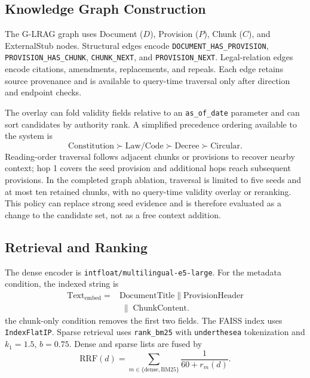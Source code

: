\subsection{Knowledge Graph Construction}
\label{sec:graph-construction}

The G-LRAG graph uses Document ($D$), Provision ($P$), Chunk ($C$), and
ExternalStub nodes. Structural edges encode
\texttt{DOCUMENT\_HAS\_PROVISION}, \texttt{PROVISION\_HAS\_CHUNK},
\texttt{CHUNK\_NEXT}, and \texttt{PROVISION\_NEXT}. Legal-relation edges encode
citations, amendments, replacements, and repeals. Each edge retains source
provenance and is available to query-time traversal only after direction and
endpoint checks.

The overlay can fold validity fields relative to an \texttt{as\_of\_date}
parameter and can sort candidates by authority rank. A simplified precedence
ordering available to the system is
\begin{equation}
\text{Constitution} \succ \text{Law/Code} \succ
\text{Decree} \succ \text{Circular}.
\end{equation}
Reading-order traversal follows adjacent chunks or provisions to recover
nearby context; hop 1 covers the seed provision and additional hops reach
subsequent provisions. In the completed graph ablation, traversal is limited
to five seeds and at most ten retained chunks, with no query-time validity
overlay or reranking. This policy can replace strong seed evidence and is
therefore evaluated as a change to the candidate set, not as a free context
addition.

\subsection{Retrieval and Ranking}
\label{sec:retrieval-ranking}

The dense encoder is \texttt{intfloat/multilingual-e5-large}. For the
metadata condition, the indexed string is
\begin{equation}
\begin{aligned}
\text{Text}_{\mathrm{embed}}={}&\text{DocumentTitle}
\;\parallel\;\text{ProvisionHeader}\\
&\;\parallel\;\text{ChunkContent}.
\end{aligned}
\end{equation}
the chunk-only condition removes the first two fields. The FAISS index uses
\texttt{IndexFlatIP}. Sparse retrieval uses \texttt{rank\_bm25} with
\texttt{underthesea} tokenization and $k_1=1.5$, $b=0.75$. Dense and sparse
lists are fused by
\begin{equation}
\mathrm{RRF}(d)=\sum_{m\in\{\mathrm{dense},\mathrm{BM25}\}}
\frac{1}{60+r_m(d)}.
\end{equation}

